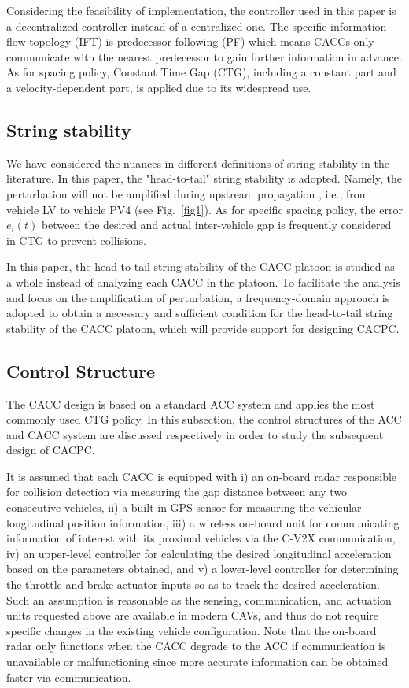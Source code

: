 \documentclass[journal]{IEEEtran}
\begin{document}
Considering the feasibility of implementation, the controller used in this paper is a decentralized controller instead of a centralized one. The specific information flow topology (IFT) is predecessor following (PF) which means CACCs only communicate with the nearest predecessor to gain further information in advance. As for spacing policy, Constant Time Gap (CTG), including a constant part and a velocity-dependent part, is applied due to its widespread use.

\subsection{String stability}
\label{Section 2.2}

We have considered the nuances in different definitions of string stability in the literature. In this paper, the "head-to-tail" string stability is adopted. Namely, the perturbation will not be amplified during upstream propagation \citep{qin2021analytical,montanino2021homogeneous,jin2014dynamics,zhou2020stabilizing,wang2018infrastructure}, i.e., from vehicle LV to vehicle PV4 (see Fig.~\ref{fig1}). As for specific spacing policy, the error $e_i (t)$ between the desired and actual inter-vehicle gap is frequently considered in CTG to prevent collisions.

In this paper, the head-to-tail string stability of the CACC platoon is studied as a whole instead of analyzing each CACC in the platoon. To facilitate the analysis and focus on the amplification of perturbation, a frequency-domain approach is adopted to obtain a necessary and sufficient condition for the head-to-tail string stability of the CACC platoon, which will provide support for designing CACPC.

\subsection{Control Structure}
\label{Section 2.3}
The CACC design is based on a standard ACC system and applies the most commonly used CTG policy. In this subsection, the control structures of the ACC and CACC system are discussed respectively in order to study the subsequent design of CACPC.

It is assumed that each CACC is equipped with i) an on-board radar responsible for collision detection via measuring the gap distance between any two consecutive vehicles, ii) a built-in GPS sensor for measuring the vehicular longitudinal position information, iii) a wireless on-board unit for communicating information of interest with its proximal vehicles via the C-V2X communication, iv) an upper-level controller for calculating the desired longitudinal acceleration based on the parameters obtained, and v) a lower-level controller for determining the throttle and brake actuator inputs so as to track the desired acceleration. Such an assumption is reasonable as the sensing, communication, and actuation units requested above are available in modern CAVs, and thus do not require specific changes in the existing vehicle configuration. Note that the on-board radar only functions when the CACC degrade to the ACC if communication is unavailable or malfunctioning since more accurate information can be obtained faster via communication.
\end{document}
